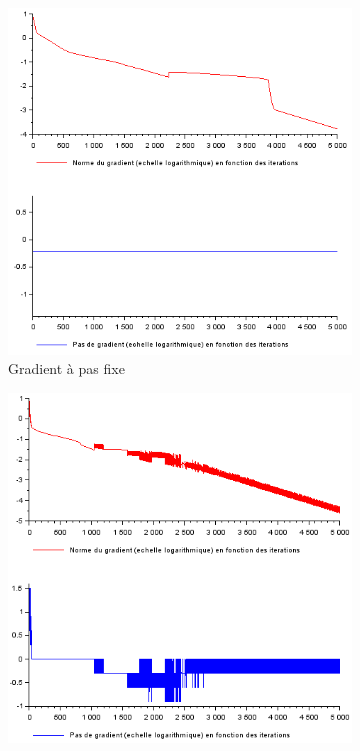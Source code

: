 \documentclass{article}
\begin{document}
        \begin{figure}
            \begin{subfigure}[t]{0.4\textwidth}
                \includegraphics[width=\textwidth]{../Images/Pas_fixe_dual.png}
                \caption{Gradient à pas fixe}
                \label{fig:pas_fixe_dual}
            \end{subfigure}
            \hfill
            \begin{subfigure}[t]{.4\textwidth}
                \includegraphics[width=\textwidth]{../Images/Pas_variable_dual.png}

\end{subfigure}
\end{figure}
\end{document}
